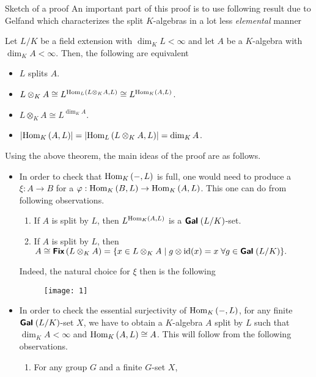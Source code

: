 \documentclass[final,20pt]{beamer}
\newcommand{\isomorph}{\cong}
\newcommand{\Gal}[1]{{\fontfamily{lmss}\selectfont 
		\text{\textbf{Gal}} \;#1
}}
\newcommand{\Fix}[1]{{\fontfamily{lmss}\selectfont 
		\text{\textbf{{Fix}}} \left (#1\right )
}}
\newcommand{\abs}[1]{\left \vert #1 \right \vert}
\newcommand{\tens}{\otimes}
\newcommand{\homset}[3]{{\fontfamily{lmr}\selectfont 
		\text{\rm Hom}_{#1}\left (#2,#3\right )
}}
\newcommand{\id}{{\fontfamily{lmr}\selectfont 
		\text{\rm id}
}}
\begin{document}
\begin{frame}
\begin{columns}[t]
\begin{column}{.32\linewidth}
				\begin{block}{Sketch of a proof}
					An important part of this proof is to use following result due to Gelfand which characterizes the split $K$-algebras in a lot less \textit{elemental} manner
					\begin{theorem}
						Let $L/K$ be a field extension with $\dim_KL <\infty $ and let $A$ be a $K$-algebra with $\dim_K A < \infty$. Then, the following are equivalent
						\begin{itemize}
							\item {$L$ splits $A$.}
							\item {$L\tens_K A \isomorph L^{\homset{L}{L\tens_K A}{L}} \isomorph L^{\homset{K}{A}{L}}$.}
							\item {$L\tens_K A \isomorph L^{\dim_K A}$.}
							\item {$\abs{\homset{K}{A}{L}} = \abs{\homset{L}{L\tens_KA}{L}} = \dim_KA$.}
						\end{itemize}
					\end{theorem}
					Using the above theorem, the main ideas of the proof are as follows.	
					\begin{itemize}
						\item {In order to check that $\homset{K}{-}{L}$ is full, one would need to produce a $\xi : A\to B$ for a $\varphi : \homset{K}{B}{L} \to \homset{K}{A}{L}$. This one can do from following observations.
							\begin{enumerate}
								\item {If $A$ is split by $L$, then $L^{\homset{K}{A}{L}}$ is a $\Gal{(L/K)}$-set.}
								\item {If $A$ is split by $L$, then $A\isomorph \Fix{L\tens_K A} = \{x\in L\tens_KA\;\vert\; g\tens \id (x)  = x \;\forall g\in \Gal{(L/K)}\}.$}
							\end{enumerate}	
						Indeed, the natural choice for $\xi$ then is the following 
						\begin{figure}
							\centering
							\texttt{[image: 1]}
						\end{figure}
					}
					\item {In order to check the essential surjectivity of $\homset{K}{-}{L}$, for any finite $\Gal{(L/K)}$-set $X$, we have to obtain a $K$-algebra $A$ split by $L$ such that $\dim_KA < \infty$ and $\homset{K}{A}{L} \isomorph A$. This will follow from the following observations.
						\begin{enumerate}
							\item {For any group $G$ and a finite $G$-set $X$,
}
\end{enumerate}}
\end{itemize}
\end{block}
\end{column}
\end{columns}
\end{frame}
\end{document}
